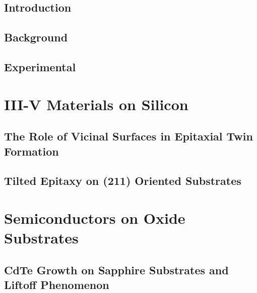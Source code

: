\documentclass[letterpaper,12pt,twoside,openright]{report}
\begin{document}
    \pagestyle{fancy}
    \fancyhead{}
    \fancyfoot{}
    \fancyfoot[CE,CO]{\thepage}

    \lstset{%
basicstyle=\footnotesize\ttfamily,
breaklines=true,
tabsize=2,
frame=single
}



\chapter{Introduction}


\chapter{Background}


\chapter{Experimental}


\part{III-V Materials on Silicon}
\chapter{The Role of Vicinal Surfaces in Epitaxial Twin Formation}


\chapter{Tilted Epitaxy on (211) Oriented Substrates}


\part{Semiconductors on Oxide Substrates}
\chapter{CdTe Growth on Sapphire Substrates and Liftoff Phenomenon}

\end{document}
